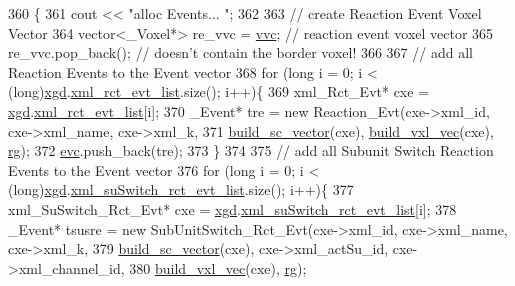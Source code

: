\begin{DoxyCode}
360                                \{
361     cout << \textcolor{stringliteral}{"alloc Events... "};
362 
363 \textcolor{comment}{//  create Reaction Event Voxel Vector}
364     vector<\_Voxel*> re\_vvc = \hyperlink{classnw_1_1_standard___ipt_a7f93dd90e12eb3a5b023e64feca48572}{vvc};    \textcolor{comment}{// reaction event voxel vector}
365     re\_vvc.pop\_back();              \textcolor{comment}{// doesn't contain the border voxel!}
366 
367 \textcolor{comment}{//  add all Reaction Events to the Event vector}
368     \textcolor{keywordflow}{for} (\textcolor{keywordtype}{long} i = 0; i < (long)\hyperlink{classnw_1_1_standard___ipt_aad5708d9729b7a5f660dade1927b4d4e}{xgd}.\hyperlink{structnw_1_1_standard___ipt_1_1xml__gen__data_abc4e7ae5a154343c1d3d25917bd58a5f}{xml\_rct\_evt\_list}.size(); i++)\{
369         xml\_Rct\_Evt* cxe = \hyperlink{classnw_1_1_standard___ipt_aad5708d9729b7a5f660dade1927b4d4e}{xgd}.\hyperlink{structnw_1_1_standard___ipt_1_1xml__gen__data_abc4e7ae5a154343c1d3d25917bd58a5f}{xml\_rct\_evt\_list}[i];
370         \_Event* tre =   \textcolor{keyword}{new} Reaction\_Evt(cxe->xml\_id, cxe->xml\_name, cxe->xml\_k,
371                         \hyperlink{classnw_1_1_standard___ipt_a5623430707739fdabf4d99599e6444a2}{build\_sc\_vector}(cxe), \hyperlink{classnw_1_1_standard___ipt_a834bc59d1c945553aad59de7b23e019f}{build\_vxl\_vec}(cxe), 
      \hyperlink{classnw_1_1_standard___ipt_a18f5e3cad0d5eef81443dfaf8949ba4b}{rg});
372         \hyperlink{classnw_1_1_standard___ipt_aed79f0ae61a44f1d3aceb6839a8a7733}{evc}.push\_back(tre);
373     \}
374 
375 \textcolor{comment}{//  add all Subunit Switch Reaction Events to the Event vector}
376     \textcolor{keywordflow}{for} (\textcolor{keywordtype}{long} i = 0; i < (long)\hyperlink{classnw_1_1_standard___ipt_aad5708d9729b7a5f660dade1927b4d4e}{xgd}.\hyperlink{structnw_1_1_standard___ipt_1_1xml__gen__data_a4da34a5918c4e045ed5021da6fdbc6bf}{xml\_suSwitch\_rct\_evt\_list}.size(); i++)\{
377         xml\_SuSwitch\_Rct\_Evt* cxe = \hyperlink{classnw_1_1_standard___ipt_aad5708d9729b7a5f660dade1927b4d4e}{xgd}.\hyperlink{structnw_1_1_standard___ipt_1_1xml__gen__data_a4da34a5918c4e045ed5021da6fdbc6bf}{xml\_suSwitch\_rct\_evt\_list}[i];
378         \_Event* tsusre =    \textcolor{keyword}{new} SubUnitSwitch\_Rct\_Evt(cxe->xml\_id, cxe->xml\_name, cxe->xml\_k,
379                             \hyperlink{classnw_1_1_standard___ipt_a5623430707739fdabf4d99599e6444a2}{build\_sc\_vector}(cxe), cxe->xml\_actSu\_id, cxe->xml\_channel\_id,
380                             \hyperlink{classnw_1_1_standard___ipt_a834bc59d1c945553aad59de7b23e019f}{build\_vxl\_vec}(cxe), \hyperlink{classnw_1_1_standard___ipt_a18f5e3cad0d5eef81443dfaf8949ba4b}{rg});

\end{DoxyCode}
